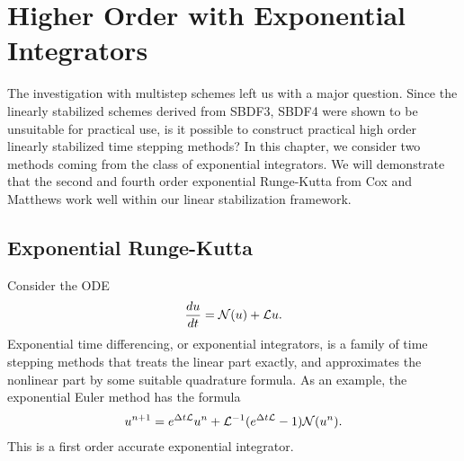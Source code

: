 \chapter{Higher Order with Exponential Integrators}
The investigation with multistep schemes left us with a major question. Since the linearly stabilized schemes derived from SBDF3, SBDF4 were shown to be unsuitable for practical use, is it possible to construct practical high order linearly stabilized time stepping methods? In this chapter, we consider two methods coming from the class of exponential integrators. We will demonstrate that the second and fourth order exponential Runge-Kutta from Cox and Matthews \cite{cox2002exponential} work well within our linear stabilization framework.

\section{Exponential Runge-Kutta}
\label{sect:exp rk}
Consider the ODE
\begin{align}
\frac{du}{dt} = \mathcal{N}(u) + \mathcal{L} u.
\end{align}
Exponential time differencing, or exponential integrators, is a family of time stepping methods that treats the linear part exactly, and approximates the nonlinear part by some suitable quadrature formula. As an example, the exponential Euler method has the formula
\begin{align}
u^{n+1} 
= e^{\Delta t\mathcal{L}} u^n + \mathcal{L}^{-1}(e^{\Delta t\mathcal{L}}  -1) \mathcal{N}(u^n).
\end{align}
This is a first order accurate exponential integrator. 
 
